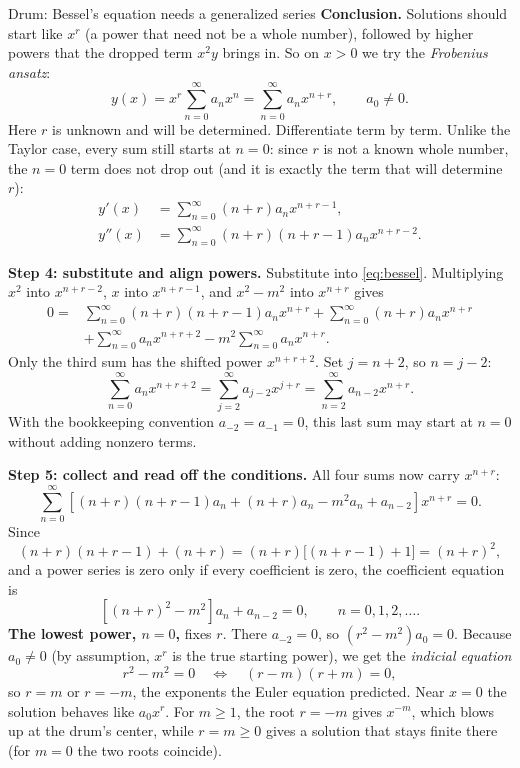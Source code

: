 \documentclass[11pt]{beamer}
\begin{document}
\begin{frame}[allowframebreaks=1.00]{Drum: Bessel's equation needs a generalized series}
\textbf{Conclusion.} Solutions should start like \(x^r\) (a power that need not be a whole number),
followed by higher powers that the dropped term \(x^2y\) brings in. So on \(x>0\) we try the
\emph{Frobenius ansatz}:
\begin{equation}
  y(x)=x^r\sum_{n=0}^{\infty}a_nx^n
      =\sum_{n=0}^{\infty}a_nx^{n+r},
  \qquad a_0\ne0.
  \label{eq:frob-series}
\end{equation}
Here \(r\) is unknown and will be determined. Differentiate term by term. Unlike the Taylor case,
every sum still starts at \(n=0\): since \(r\) is not a known whole number, the \(n=0\) term does not
drop out (and it is exactly the term that will determine \(r\)):
\[
\begin{aligned}
  y'(x)
    &=\sum_{n=0}^{\infty}(n+r)a_nx^{n+r-1},\\
  y''(x)
    &=\sum_{n=0}^{\infty}(n+r)(n+r-1)a_nx^{n+r-2}.
\end{aligned}
\]


\textbf{Step 4: substitute and align powers.}  Substitute into \eqref{eq:bessel}. Multiplying
\(x^2\) into \(x^{n+r-2}\), \(x\) into \(x^{n+r-1}\), and \(x^2-m^2\) into \(x^{n+r}\) gives
\[
\begin{aligned}
0={}&\sum_{n=0}^{\infty}(n+r)(n+r-1)a_nx^{n+r}
+\sum_{n=0}^{\infty}(n+r)a_nx^{n+r}\\
&+\sum_{n=0}^{\infty}a_nx^{n+r+2}
-m^2\sum_{n=0}^{\infty}a_nx^{n+r}.
\end{aligned}
\]
Only the third sum has the shifted power $x^{n+r+2}$.  Set $j=n+2$, so $n=j-2$:
\[
  \sum_{n=0}^{\infty}a_nx^{n+r+2}
    =\sum_{j=2}^{\infty}a_{j-2}x^{j+r}
    =\sum_{n=2}^{\infty}a_{n-2}x^{n+r}.
\]
With the bookkeeping convention $a_{-2}=a_{-1}=0$, this last sum may start at $n=0$
without adding nonzero terms.


\textbf{Step 5: collect and read off the conditions.}  All four sums now carry \(x^{n+r}\):
\[
  \sum_{n=0}^{\infty}
  \left[
    (n+r)(n+r-1)a_n+(n+r)a_n-m^2a_n+a_{n-2}
  \right]x^{n+r}=0.
\]
Since
\[
  (n+r)(n+r-1)+(n+r)
  =(n+r)\bigl[(n+r-1)+1\bigr]
  =(n+r)^2,
\]
and a power series is zero only if every coefficient is zero, the coefficient equation is
\begin{equation}
  \left[(n+r)^2-m^2\right]a_n+a_{n-2}=0,
  \qquad n=0,1,2,\ldots.
  \label{eq:bessel-coeff}
\end{equation}
\textbf{The lowest power, \(n=0\),} fixes \(r\). There \(a_{-2}=0\), so \((r^2-m^2)a_0=0\). Because \(a_0\ne0\) (by
assumption, \(x^r\) is the true starting power), we get the \emph{indicial equation}
\begin{equation}
  r^2-m^2=0
  \quad\Longleftrightarrow\quad
  (r-m)(r+m)=0,
  \label{eq:indicial-bessel}
\end{equation}
so $r=m$ or $r=-m$, the exponents the Euler equation predicted.
Near $x=0$ the solution behaves like $a_0x^r$.  For $m\ge1$, the root $r=-m$ gives
$x^{-m}$, which blows up at the drum's center, while $r=m\ge0$ gives a solution that
stays finite there (for $m=0$ the two roots coincide).
\end{frame}
\end{document}
